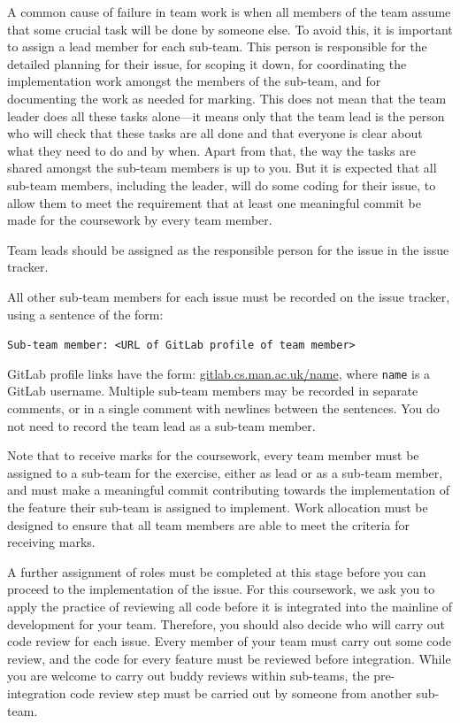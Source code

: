\documentclass[
]{book}
\begin{document}
A common cause of failure in team work is when all members of the team assume that some crucial task will be done by someone else. To avoid this, it is important to assign a lead member for each sub-team. This person is responsible for the detailed planning for their issue, for scoping it down, for coordinating the implementation work amongst the
members of the sub-team, and for documenting the work as needed for marking. This does not mean that the team leader does all these tasks alone---it means only that the team lead is the person who will check that these tasks are all done and that everyone is clear about what they need to do and by when. Apart from that, the way the tasks are shared amongst the sub-team members is up to you. But it is expected that all sub-team members, including the leader, will do some coding for their issue, to allow them to meet the requirement that at least one meaningful commit be made for the coursework by every team member.

Team leads should be assigned as the responsible person for the issue in the issue tracker.

All other sub-team members for each issue must be recorded on the issue tracker, using a sentence of the form:

\texttt{Sub-team\ member:\ \textless{}URL\ of\ GitLab\ profile\ of\ team\ member\textgreater{}}

GitLab profile links have the form: \href{https://gitlab.cs.man.ac.uk/name}{gitlab.cs.man.ac.uk/name}, where \texttt{name} is a GitLab username. Multiple sub-team members may be recorded in separate comments, or in a single comment with newlines between the sentences. You do not need to record the team lead as a sub-team member.

Note that to receive marks for the coursework, every team member must be assigned to a sub-team for the exercise, either as lead or as a sub-team member, and must make a meaningful commit contributing towards the implementation of the feature their sub-team is assigned to implement. Work allocation must be designed to ensure that all team members are able to meet the criteria for receiving marks.

A further assignment of roles must be completed at this stage before you can proceed to the implementation of the issue. For this coursework, we ask you to apply the practice of reviewing all code before it is integrated into the mainline of development for your team. Therefore, you should also decide who will carry out code review for each issue. Every member of your team must carry out some code review, and the code for every feature must be reviewed before integration. While you are welcome to carry out buddy reviews within sub-teams, the pre-integration code review step must be carried out by someone from another sub-team.
\end{document}
